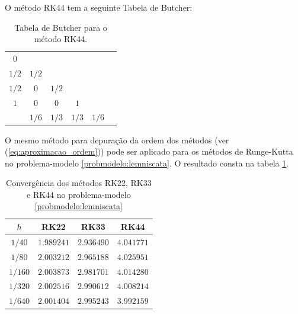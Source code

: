 \begin{method}\label{metodo:rk44} 
    O método RK44 tem a seguinte Tabela de Butcher:
    \begin{table}[H]
        \centering
        \begin{tabular}{c|ccccc}
             $0$      &       &       &       &\\
             $1/2$    & $1/2$ &       &       &\\
             $1/2$    & $0$   & $1/2$ &       &\\
             $1$      & $0$   & $0$   & $1$   & \\
             \hline
                      & $1/6$ & $1/3$ & $1/3$ & $1/6$
        \end{tabular}
        \caption{Tabela de Butcher para o método RK44.}
    \end{table}
\end{method}

O mesmo método para depuração da ordem dos métodos (ver (\ref{eq:aproximacao_ordem})) pode ser aplicado para os métodos de Runge-Kutta no problema-modelo \ref{probmodelo:lemniscata}. O resultado consta na tabela \ref{tab:rk_lemniscata}.

\begin{table}[]
    \centering
    \begin{tabular}{c|ccc}
        $h$     & RK22 & RK33 & RK44 \\
        \hline
        $1/40$  & $1.989241$ & $2.936490$ & $4.041771$ \\
        $1/80$  & $2.003212$ & $2.965188$ & $4.025951$ \\
        $1/160$ & $2.003873$ & $2.981701$ & $4.014280$ \\
        $1/320$ & $2.002516$ & $2.990612$ & $4.008214$ \\
        $1/640$ & $2.001404$ & $2.995243$ & $3.992159$ \\
    \end{tabular}
    \caption{Convergência dos métodos RK22, RK33 e RK44 no problema-modelo \ref{probmodelo:lemniscata}}
    \label{tab:rk_lemniscata}
\end{table}


